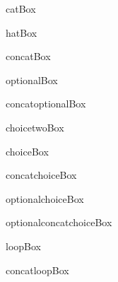 \begin{figure}
\centerline{\usebox{\catBox}}
\caption{catBox}
\label{fig:catBox}
\end{figure}

\begin{figure}
\centerline{\usebox{\hatBox}}
\caption{hatBox}
\label{fig:hatBox}
\end{figure}

\begin{figure}
\centerline{\usebox{\concatBox}}
\caption{concatBox}
\label{fig:concatBox}
\end{figure}

\begin{figure}
\centerline{\usebox{\optionalBox}}
\caption{optionalBox}
\label{fig:optionalBox}
\end{figure}

\begin{figure}
\centerline{\usebox{\concatoptionalBox}}
\caption{concatoptionalBox}
\label{fig:concatoptionalBox}
\end{figure}

\begin{figure}
\centerline{\usebox{\choicetwoBox}}
\caption{choicetwoBox}
\label{fig:choicetwoBox}
\end{figure}

\begin{figure}
\centerline{\usebox{\choiceBox}}
\caption{choiceBox}
\label{fig:choiceBox}
\end{figure}

\begin{figure}
\centerline{\usebox{\concatchoiceBox}}
\caption{concatchoiceBox}
\label{fig:concatchoiceBox}
\end{figure}

\begin{figure}
\centerline{\usebox{\optionalchoiceBox}}
\caption{optionalchoiceBox}
\label{fig:optionalchoiceBox}
\end{figure}

\begin{figure}
\centerline{\usebox{\optionalconcatchoiceBox}}
\caption{optionalconcatchoiceBox}
\label{fig:optionalconcatchoiceBox}
\end{figure}

\begin{figure}
\centerline{\usebox{\loopBox}}
\caption{loopBox}
\label{fig:loopBox}
\end{figure}

\begin{figure}
\centerline{\usebox{\concatloopBox}}
\caption{concatloopBox}
\label{fig:concatloopBox}
\end{figure}

